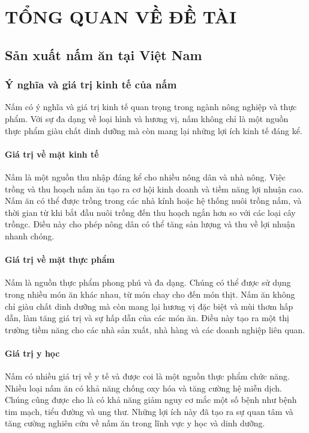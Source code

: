 \chapter{TỔNG QUAN VỀ ĐỀ TÀI}

\section{Sản xuất nấm ăn tại Việt Nam}

\subsection{Ý nghĩa và giá trị kinh tế của nấm}

Nấm có ý nghĩa và giá trị kinh tế quan trọng trong ngành nông nghiệp và thực phẩm. Với sự đa dạng về loại hình và hương vị, nấm không chỉ là một nguồn thực phẩm giàu chất dinh dưỡng mà còn mang lại những lợi ích kinh tế đáng kể.

\subsubsection{Giá trị về mặt kinh tế}
Nấm là một nguồn thu nhập đáng kể cho nhiều nông dân và nhà nông. Việc trồng và thu hoạch nấm ăn tạo ra cơ hội kinh doanh và tiềm năng lợi nhuận cao. Nấm ăn có thể được trồng trong các nhà kính hoặc hệ thống nuôi trồng nấm, và thời gian từ khi bắt đầu nuôi trồng đến thu hoạch ngắn hơn so với các loại cây trồngc. Điều này cho phép nông dân có thể tăng sản lượng và thu về lợi nhuận nhanh chóng.

\subsubsection{Giá trị về mặt thực phẩm}
Nấm là nguồn thực phẩm phong phú và đa dạng. Chúng có thể được sử dụng trong nhiều món ăn khác nhau, từ món chay cho đến món thịt. Nấm ăn không chỉ giàu chất dinh dưỡng mà còn mang lại hương vị đặc biệt và mùi thơm hấp dẫn, làm tăng giá trị và sự hấp dẫn của các món ăn. Điều này tạo ra một thị trường tiềm năng cho các nhà sản xuất, nhà hàng và các doanh nghiệp liên quan.

\subsubsection{Giá trị y học}
Nấm có nhiều giá trị về y tế và được coi là một nguồn thực phẩm chức năng. Nhiều loại nấm ăn có khả năng chống oxy hóa và tăng cường hệ miễn dịch. Chúng cũng được cho là có khả năng giảm nguy cơ mắc một số bệnh như bệnh tim mạch, tiểu đường và ung thư. Những lợi ích này đã tạo ra sự quan tâm và tăng cường nghiên cứu về nấm ăn trong lĩnh vực y học và dinh dưỡng.

